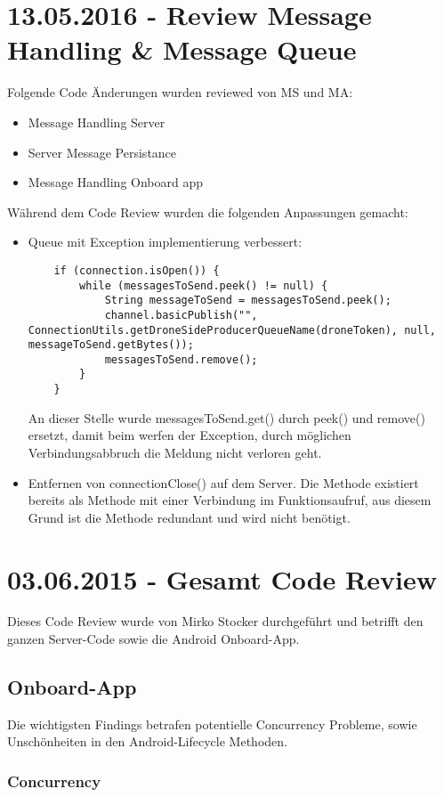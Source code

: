 \section{13.05.2016 - Review Message Handling \& Message Queue}
Folgende Code Änderungen wurden reviewed von MS und MA:
\begin{itemize}
	\item{Message Handling Server}
	\item{Server Message Persistance}
	\item{Message Handling Onboard app}
\end{itemize}
Während dem Code Review wurden die folgenden Anpassungen gemacht:
\begin{itemize}
	\item{Queue mit Exception implementierung verbessert:
	\begin{lstlisting}
    if (connection.isOpen()) {
        while (messagesToSend.peek() != null) {
            String messageToSend = messagesToSend.peek();
            channel.basicPublish("", ConnectionUtils.getDroneSideProducerQueueName(droneToken), null, messageToSend.getBytes());
            messagesToSend.remove();
        }
    }
	\end{lstlisting}
	An dieser Stelle wurde messagesToSend.get() durch peek() und remove() ersetzt, damit beim werfen der Exception, durch möglichen Verbindungsabbruch die Meldung nicht verloren geht.}
	\item{Entfernen von connectionClose() auf dem Server. Die Methode existiert bereits als Methode mit einer Verbindung im Funktionsaufruf, aus diesem Grund ist die Methode redundant und wird nicht benötigt.}
\end{itemize}
\section{03.06.2015 - Gesamt Code Review}

Dieses Code Review wurde von Mirko Stocker durchgeführt und betrifft den ganzen Server-Code sowie die Android Onboard-App.

\subsection{Onboard-App}
	 
Die wichtigsten Findings betrafen potentielle Concurrency Probleme, sowie Unschönheiten in den Android-Lifecycle Methoden.

\subsubsection{Concurrency}

